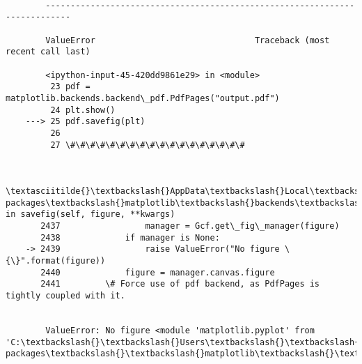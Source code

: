 \documentclass[11pt]{article}
\begin{document}
    \begin{Verbatim}[commandchars=\\\{\}]

        ---------------------------------------------------------------------------

        ValueError                                Traceback (most recent call last)

        <ipython-input-45-420dd9861e29> in <module>
         23 pdf = matplotlib.backends.backend\_pdf.PdfPages("output.pdf")
         24 plt.show()
    ---> 25 pdf.savefig(plt)
         26 
         27 \#\#\#\#\#\#\#\#\#\#\#\#\#\#\#\#\#\#
    

        \textasciitilde{}\textbackslash{}AppData\textbackslash{}Local\textbackslash{}Continuum\textbackslash{}anaconda3\textbackslash{}lib\textbackslash{}site-packages\textbackslash{}matplotlib\textbackslash{}backends\textbackslash{}backend\_pdf.py in savefig(self, figure, **kwargs)
       2437                 manager = Gcf.get\_fig\_manager(figure)
       2438             if manager is None:
    -> 2439                 raise ValueError("No figure \{\}".format(figure))
       2440             figure = manager.canvas.figure
       2441         \# Force use of pdf backend, as PdfPages is tightly coupled with it.
    

        ValueError: No figure <module 'matplotlib.pyplot' from 'C:\textbackslash{}\textbackslash{}Users\textbackslash{}\textbackslash{}ckato\textbackslash{}\textbackslash{}AppData\textbackslash{}\textbackslash{}Local\textbackslash{}\textbackslash{}Continuum\textbackslash{}\textbackslash{}anaconda3\textbackslash{}\textbackslash{}lib\textbackslash{}\textbackslash{}site-packages\textbackslash{}\textbackslash{}matplotlib\textbackslash{}\textbackslash{}pyplot.py'>

    \end{Verbatim}
\end{document}
